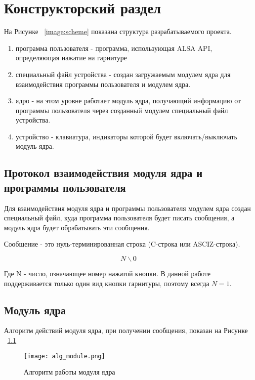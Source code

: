 \chapter{Конструкторский раздел}

На Рисунке ~\ref{image:scheme} показана структура разрабатываемого проекта.

\begin{enumerate}
\item программа пользователя - программа, использующая ALSA API, определяющая нажатие на гарнитуре
\item специальный файл устройства - создан загружаемым модулем ядра для взаимодействия программы пользователя и модулем ядра.
\item ядро - на этом уровне работает модуль ядра, получающий информацию от программы пользователя через созданный модулем специальный файл устройства.
\item устройство - клавиатура, индикаторы которой будет включать/выключать модуль ядра.
\end{enumerate}

\section{Протокол взаимодействия модуля ядра и программы пользователя}

Для взаимодействия модуля ядра и программы пользователя модулем ядра создан специальный файл, куда программа пользователя будет писать сообщения, а модуль ядра будет обрабатывать эти сообщения.

Сообщение - это нуль-терминированная строка (C-строка или ASCIZ-строка). 

$$N \backslash 0$$ 

Где N - число, означающее номер нажатой кнопки. В данной работе поддерживается только один вид кнопки гарнитуры, поэтому всегда $N = 1$.

\section{Модуль ядра}

Алгоритм действий модуля ядра, при получении сообщения, показан на Рисунке ~\ref{image:alg_module}

\begin{figure}[h]
  \centering
  \texttt{[image: alg\_module.png]}
  \caption{Алгоритм работы модуля ядра}
  \label{image:alg_module}
\end{figure}

